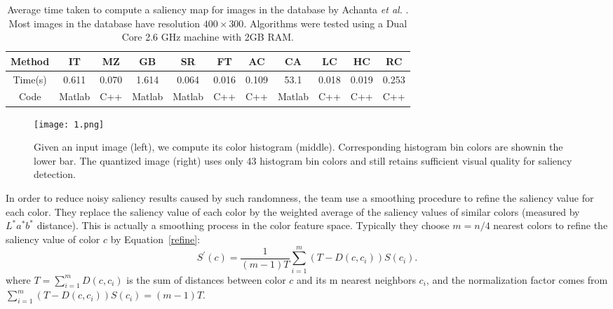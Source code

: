 \documentclass[10pt,twocolumn,letterpaper]{article}
\begin{document}
\begin{table*}
	\caption{Average time taken to compute a saliency map for images in the database by Achanta \emph{et al.} \cite{Achanta2009Frequency}. Most images in the database have resolution $400\times 300$. Algorithms were tested using a Dual Core 2.6 GHz machine with 2GB RAM.}\label{t1}
	\begin{center}
		\begin{tabular}{c|c|c|c|c|c|c|c|c|c|c|}
			\hline
			Method & IT\cite{Itti1998A}& MZ\cite{Ma2003Contrast}& GB\cite{Sch2006Graph}& SR\cite{Hou2007Saliency}& FT\cite{Achanta2009Frequency}& AC\cite{Achanta2008Salient}& CA\cite{Goferman2012Context}& LC\cite{Zhai2006Visual}& HC& RC \\
			\hline
			Time(s) & 0.611& 0.070& 1.614& 0.064& 0.016& 0.109& 53.1& 0.018& 0.019& 0.253 \\
			\hline
			Code & Matlab& C++& Matlab& Matlab& C++& C++& Matlab& C++& C++& C++ \\
			\hline
		\end{tabular}
	\end{center}
\end{table*}

\begin{figure}
	\begin{center}
		\texttt{[image: 1.png]}
	\end{center}
	\caption{Given an input image (left), we compute its color histogram (middle). Corresponding histogram bin colors are shownin the lower bar. The quantized image (right) uses only 43 histogram bin colors and still retains sufficient visual quality for saliency detection.}
	\label{fig:1}
\end{figure}

In order to reduce noisy saliency results caused by such randomness, the team use a smoothing procedure to refine the saliency value for each color. They replace the saliency value of each color by the weighted average of the saliency values of similar colors (measured by $L^*a^*b^*$ distance). This is actually a smoothing process in the color feature space. Typically they choose $m = n/4$ nearest colors to refine the saliency value of color $c$ by Equation~\ref{refine}:
\begin{equation}
S^\prime(c)=\frac{1}{(m-1)T}\sum_{i=1}^{m}(T-D(c,c_i))S(c_i).   \label{refine}
\end{equation}
where $T = \sum_{i=1}^{m}D(c,c_i)$ is the sum of distances between color $c$ and its m nearest neighbors $c_i$, and the normalization factor comes from $\sum_{i=1}^{m}(T-D(c,c_i))S(c_i)=(m-1)T$.
\end{document}
